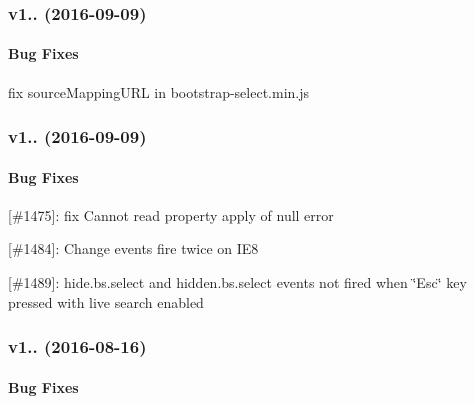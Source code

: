 \subsubsection*{v1.. (2016-\/09-\/09)}

\paragraph*{Bug Fixes}


\begin{DoxyItemize}
\item fix source\+Mapping\+U\+RL in bootstrap-\/select.\+min.\+js 


\end{DoxyItemize}

\subsubsection*{v1.. (2016-\/09-\/09)}

\paragraph*{Bug Fixes}


\begin{DoxyItemize}
\item \mbox{[}\#1475\mbox{]}\+: fix Cannot read property \textquotesingle{}apply\textquotesingle{} of null error
\item \mbox{[}\#1484\mbox{]}\+: Change events fire twice on I\+E8
\item \mbox{[}\#1489\mbox{]}\+: hide.\+bs.\+select and hidden.\+bs.\+select events not fired when \char`\"{}\+Esc\char`\"{} key pressed with live search enabled
\end{DoxyItemize}





\subsubsection*{v1.. (2016-\/08-\/16)}

\paragraph*{Bug Fixes}


